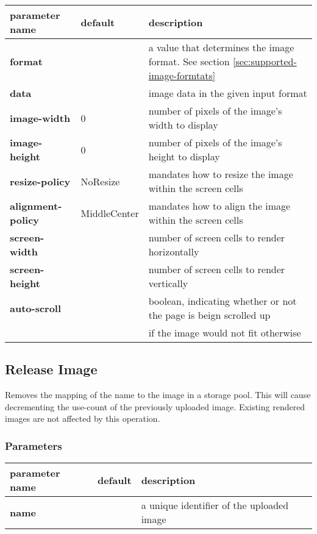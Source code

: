 \documentclass[a4paper]{article}
\begin{document}
\begin{tabular}{|l|l|l|}
    \hline
    \textbf{parameter name} & \textbf{default} & \textbf{description} \\
    \hline
    \textbf{format} & & a value that determines the image format. See section \ref{sec:supported-image-formtats} \\
    \textbf{data} & & image data in the given input format \\
    \textbf{image-width} & 0 & number of pixels of the image's width to display \\
    \textbf{image-height} & 0 & number of pixels of the image's height to display \\
    \textbf{resize-policy} & NoResize & mandates how to resize the image within the screen cells \\
    \textbf{alignment-policy} & MiddleCenter & mandates how to align the image within the screen cells \\
    \textbf{screen-width} & & number of screen cells to render horizontally \\
    \textbf{screen-height} & & number of screen cells to render vertically \\
    \textbf{auto-scroll} & & boolean, indicating whether or not the page is beign scrolled up \\
            & & if the image would not fit otherwise \\
    \hline
\end{tabular}


\subsection{Release Image}

Removes the mapping of the name to the image in a storage pool.
This will cause decrementing the use-count of the previously uploaded image.
Existing rendered images are not affected by this operation.

\subsubsection*{Parameters}

\begin{tabular}{|l|l|l|}
    \hline
    \textbf{parameter name} & \textbf{default} & \textbf{description} \\
    \hline
    \textbf{name}       & & a unique identifier of the uploaded image \\
    \hline
\end{tabular}
\end{document}
